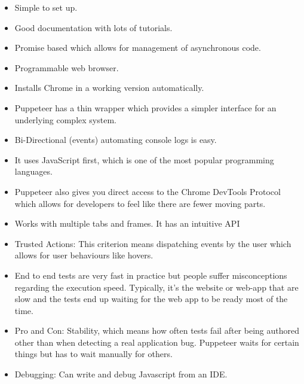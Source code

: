 \documentclass[12pt,a4paper,titlepage]{report}
\begin{document}
\begin{itemize}
 \item Simple to set up.
 \item Good documentation with lots of tutorials.
 \item Promise based which allows for management of asynchronous code.
 \item Programmable web browser.
 \item Installs Chrome in a working version automatically.
 \item Puppeteer has a thin wrapper which provides a simpler interface for an underlying complex system.
 \item Bi-Directional (events) \- automating console logs is easy.
 \item It uses JavaScript first, which is one of the most popular programming languages.
 \item Puppeteer also gives you direct access to the Chrome DevTools Protocol which allows for developers to feel like there are fewer moving parts.
 \item Works with multiple tabs and frames. It has an intuitive API
 \item Trusted Actions: This criterion means dispatching events by the user which allows for user behaviours like hovers.
 \item End to end tests are very fast in practice but people suffer misconceptions regarding the execution speed. Typically, it's the website or web-app that are slow and the tests end up waiting for the web app to be ready most of the time.
 \item Pro and Con: Stability, which means how often tests fail after being authored other than when detecting a real application bug. Puppeteer waits for certain things but has to wait manually for others. 
 \item Debugging: Can write and debug Javascript from an IDE\@.
\end{itemize}
\end{document}
